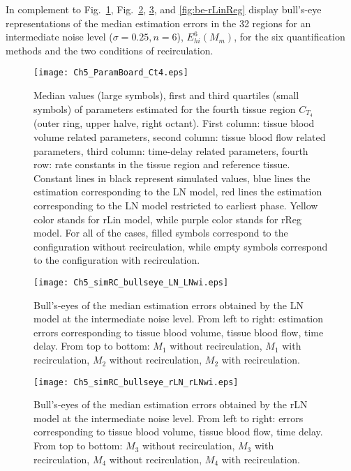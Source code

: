 In complement to Fig.~\ref{fig:estpar4}, Fig.~\ref{fig:be-LN}, \ref{fig:be-rLN}, and \ref{fig:be-rLinReg} display bull's-eye representations of the median estimation errors in the 32 regions for an intermediate noise level ($\sigma=0.25, n=6$), $E_{hi}^{6}(M_m)$, for the six quantification methods and the two conditions of recirculation. 
\begin{figure}
\center
\texttt{[image: Ch5\_ParamBoard\_Ct4.eps]}
\caption{Median values (large symbols), first and third quartiles (small symbols) of parameters estimated for the fourth tissue region $C_{T_4}$ (outer ring, upper halve, right octant). First column: tissue blood volume related parameters, second column: tissue blood flow related parameters, third column: time-delay related parameters, fourth row: rate constants in the tissue region and reference tissue. Constant lines in black represent simulated values, blue lines the estimation corresponding to the LN model, red lines the estimation corresponding to the LN model restricted to earliest phase. Yellow color stands for rLin model, while purple color stands for rReg model. For all of the cases, filled symbols correspond to the configuration without recirculation, while empty symbols correspond to the configuration with recirculation.}
\label{fig:estpar4}
\vspace{-3mm}
\end{figure}

\begin{figure}
\center
\texttt{[image: Ch5\_simRC\_bullseye\_LN\_LNwi.eps]}
\caption{Bull's-eyes of the median estimation errors obtained by the LN model at the intermediate noise level. From left to right: estimation errors corresponding to tissue blood volume, tissue blood flow, time delay. From top to bottom: $M_1$ without recirculation, $M_1$ with recirculation, $M_2$ without recirculation, $M_2$ with recirculation.}
\label{fig:be-LN}
\vspace{-3mm}
\end{figure}

\begin{figure}
\center
\texttt{[image: Ch5\_simRC\_bullseye\_rLN\_rLNwi.eps]}
\caption{Bull's-eyes of the median estimation errors obtained by the rLN model at the intermediate noise level. From left to right: errors corresponding to tissue blood volume, tissue blood flow, time delay. From top to bottom: $M_3$ without recirculation, $M_3$ with recirculation, $M_4$ without recirculation, $M_4$ with recirculation.}
\label{fig:be-rLN}
\vspace{-3mm}
\end{figure}


